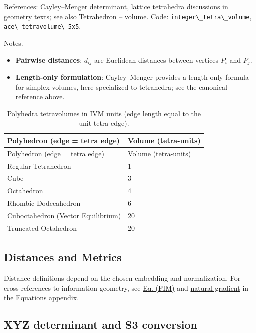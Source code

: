 \documentclass[
  10pt,
]{article}
\newcommand{\passthrough}[1]{#1}
\providecommand{\tightlist}{%
  \setlength{\itemsep}{0pt}\setlength{\parskip}{0pt}}
\begin{document}
References:
\href{https://en.wikipedia.org/wiki/Cayley\%E2\%80\%93Menger_determinant}{Cayley--Menger
determinant}, lattice tetrahedra discussions in geometry texts; see also
\href{https://en.wikipedia.org/wiki/Tetrahedron\#Volume}{Tetrahedron --
volume}. Code: \passthrough{\lstinline!integer\_tetra\_volume!},
\passthrough{\lstinline!ace\_tetravolume\_5x5!}.

Notes.

\begin{itemize}
\tightlist
\item
  \textbf{Pairwise distances}: \(d_{ij}\) are Euclidean distances
  between vertices \(P_i\) and \(P_j\).
\item
  \textbf{Length-only formulation}: Cayley--Menger provides a
  length-only formula for simplex volumes, here specialized to
  tetrahedra; see the canonical reference above.
\end{itemize}

\begin{longtable}[]{@{}ll@{}}
\caption{Polyhedra tetravolumes in IVM units (edge length equal to the
unit tetra edge).}\label{tbl:polyhedra_volumes}\tabularnewline
\toprule\noalign{}
Polyhedron (edge = tetra edge) & Volume (tetra-units) \\
\midrule\noalign{}
\endfirsthead
\toprule\noalign{}
Polyhedron (edge = tetra edge) & Volume (tetra-units) \\
\midrule\noalign{}
\endhead
\bottomrule\noalign{}
\endlastfoot
Regular Tetrahedron & 1 \\
Cube & 3 \\
Octahedron & 4 \\
Rhombic Dodecahedron & 6 \\
Cuboctahedron (Vector Equilibrium) & 20 \\
Truncated Octahedron & 20 \\
\end{longtable}

\subsection{Distances and Metrics}\label{distances-and-metrics}

Distance definitions depend on the chosen embedding and normalization.
For cross-references to information geometry, see
\href{08_equations_appendix.md\#eq:fim}{Eq. (FIM)} and
\href{08_equations_appendix.md\#eq:natgrad}{natural gradient} in the
Equations appendix.

\subsection{XYZ determinant and S3 conversion}\label{sec:xyz_conversion}
\end{document}
